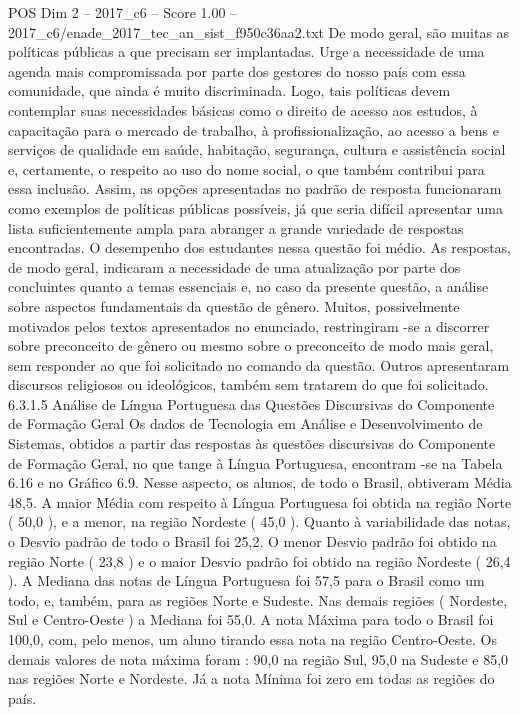 \begin{textsample}{POS Dim 2 – 2017\_c6 – Score 1.00 – 2017\_c6/enade\_2017\_tec\_an\_sist\_f950c36aa2.txt}
De modo geral, são muitas as políticas públicas a que precisam ser implantadas.
Urge a necessidade de uma agenda mais compromissada por parte dos gestores do nosso país com essa comunidade, que ainda é muito discriminada.
Logo, tais políticas devem contemplar suas necessidades básicas como o direito de acesso aos estudos, à capacitação para o mercado de trabalho, à profissionalização, ao acesso a bens e serviços de qualidade em saúde, habitação, segurança, cultura e assistência social e, certamente, o respeito ao uso do nome social, o que também contribui para essa inclusão.
Assim, as opções apresentadas no padrão de resposta funcionaram como exemplos de políticas públicas possíveis, já que seria difícil apresentar uma lista suficientemente ampla para abranger a grande variedade de respostas encontradas.
O desempenho dos estudantes nessa questão foi médio.
As respostas, de modo geral, indicaram a necessidade de uma atualização por parte dos concluintes quanto a temas essenciais e, no caso da presente questão, a análise sobre aspectos fundamentais da questão de gênero.
Muitos, possivelmente motivados pelos textos apresentados no enunciado, restringiram -se a discorrer sobre preconceito de gênero ou mesmo sobre o preconceito de modo mais geral, sem responder ao que foi solicitado no comando da questão.
Outros apresentaram discursos religiosos ou ideológicos, também sem tratarem do que foi solicitado. 6.3.1.5 Análise de Língua Portuguesa das Questões Discursivas do Componente de Formação Geral Os dados de Tecnologia em Análise e Desenvolvimento de Sistemas, obtidos a partir das respostas às questões discursivas do Componente de Formação Geral, no que tange à Língua Portuguesa, encontram -se na Tabela 6.16 e no Gráfico 6.9.
Nesse aspecto, os alunos, de todo o Brasil, obtiveram Média 48,5.
A maior Média com respeito à Língua Portuguesa foi obtida na região Norte ( 50,0 ), e a menor, na região Nordeste ( 45,0 ).
Quanto à variabilidade das notas, o Desvio padrão de todo o Brasil foi 25,2.
O menor Desvio padrão foi obtido na região Norte ( 23,8 ) e o maior Desvio padrão foi obtido na região Nordeste ( 26,4 ).
A Mediana das notas de Língua Portuguesa foi 57,5 para o Brasil como um todo, e, também, para as regiões Norte e Sudeste.
Nas demais regiões ( Nordeste, Sul e Centro-Oeste ) a Mediana foi 55,0.
A nota Máxima para todo o Brasil foi 100,0, com, pelo menos, um aluno tirando essa nota na região Centro-Oeste.
Os demais valores de nota máxima foram : 90,0 na região Sul, 95,0 na Sudeste e 85,0 nas regiões Norte e Nordeste.
Já a nota Mínima foi zero em todas as regiões do país.

\end{textsample}
